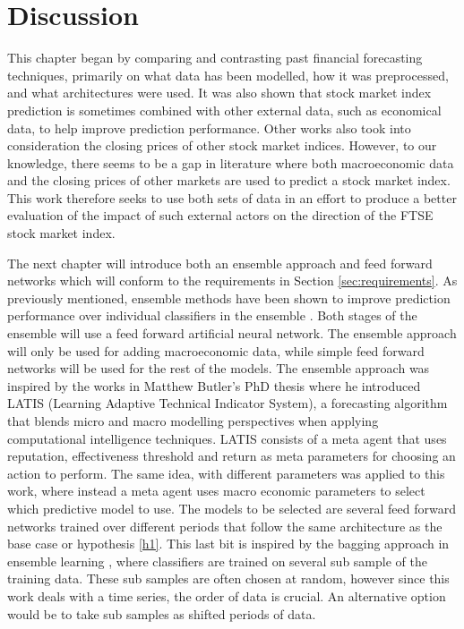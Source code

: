 \documentclass{UoYCSproject}
\begin{document}
\section{Discussion}
\label{sec:discussion}
This chapter began by comparing and contrasting past financial forecasting techniques, primarily on what data has been modelled, how it was preprocessed, and what architectures were used. It was also shown that stock market index prediction is sometimes combined with other external data, such as economical data, to help improve prediction performance. Other works also took into consideration the closing prices of other stock market indices. However, to our knowledge, there seems to be a gap in literature where both macroeconomic data and the closing prices of other markets are used to predict a stock market index. This work therefore seeks to use both sets of data in an effort to produce a better evaluation of the impact of such external actors on the direction of the FTSE stock market index.   

The next chapter will introduce both an ensemble approach and feed forward networks which will conform to the requirements in Section \ref{sec:requirements}. As previously mentioned, ensemble methods have been shown to improve prediction performance over individual classifiers in the ensemble \cite{opitz1999popular}. Both stages of the ensemble will use a feed forward artificial neural network. The ensemble approach will only be used for adding macroeconomic data, while simple feed forward networks will be used for the rest of the models. The ensemble approach was inspired by the works in Matthew Butler's PhD thesis \cite{butler2012computational} where he introduced LATIS (Learning Adaptive Technical Indicator System), a forecasting algorithm that blends micro and macro modelling perspectives when applying computational intelligence techniques. LATIS consists of a meta agent that uses reputation, effectiveness threshold and return as meta parameters for choosing an action to perform. The same idea, with different parameters was applied to this work, where instead a meta agent uses macro economic parameters to select which predictive model to use. The models to be selected are several feed forward networks trained over different periods that follow the same architecture as the base case or hypothesis \ref{h1}. This last bit is inspired by the bagging approach in ensemble learning \cite{breiman1996bagging}, where classifiers are trained on several sub sample of the training data. These sub samples are often chosen at random, however since this work deals with a time series, the order of data is crucial. An alternative option would be to take sub samples as shifted periods of data.
\end{document}
